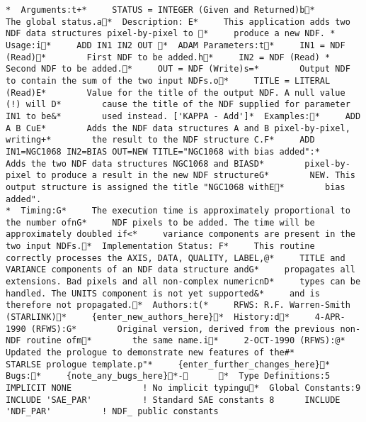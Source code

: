 {\begin{verbatim}
 *  Arguments:t+ *     STATUS = INTEGER (Given and Returned)b *        The global status.a   *  Description: E *     This application adds two NDF data structures pixel-by-pixel to  *     produce a new NDF.  	 *  Usage:i *     ADD IN1 IN2 OUT    *  ADAM Parameters:t *     IN1 = NDF (Read) *        First NDF to be added.h *     IN2 = NDF (Read)  *        Second NDF to be added. *     OUT = NDF (Write)s= *        Output NDF to contain the sum of the two input NDFs.o *     TITLE = LITERAL (Read)E *        Value for the title of the output NDF. A null value (!) will D *        cause the title of the NDF supplied for parameter IN1 to be& *        used instead. ['KAPPA - Add']   *  Examples: *     ADD A B CuE *        Adds the NDF data structures A and B pixel-by-pixel, writing + *        the result to the NDF structure C. F *     ADD IN1=NGC1068 IN2=BIAS OUT=NEW TITLE="NGC1068 with bias added": *        Adds the two NDF data structures NGC1068 and BIASD *        pixel-by-pixel to produce a result in the new NDF structureG *        NEW. This output structure is assigned the title "NGC1068 withE *        bias added".   
 *  Timing:G *     The execution time is approximately proportional to the number ofnG *     NDF pixels to be added. The time will be approximately doubled if < *     variance components are present in the two input NDFs.   *  Implementation Status: F *     This routine correctly processes the AXIS, DATA, QUALITY, LABEL,@ *     TITLE and VARIANCE components of an NDF data structure andG *     propagates all extensions. Bad pixels and all non-complex numericnD *     types can be handled. The UNITS component is not yet supported& *     and is therefore not propagated.   *  Authors:t( *     RFWS: R.F. Warren-Smith (STARLINK) *     {enter_new_authors_here}   *  History:d *     4-APR-1990 (RFWS):G *        Original version, derived from the previous non-NDF routine ofm *        the same name.i *     2-OCT-1990 (RFWS):@ *        Updated the prologue to demonstrate new features of the# *        STARLSE prologue template.p" *     {enter_further_changes_here}   *  Bugs: *     {note_any_bugs_here}   *-        *  Type Definitions:5       IMPLICIT NONE              ! No implicit typingu   *  Global Constants:9       INCLUDE 'SAE_PAR'          ! Standard SAE constants 8       INCLUDE 'NDF_PAR'          ! NDF_ public constants  

\end{verbatim}}
